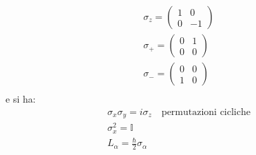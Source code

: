 \begin{itemize}
\begin{equation}
\begin{split}
\sigma_z=\left(\begin{matrix}1&0\\0&-1\end{matrix}\right) \\
\sigma_+=\left(\begin{matrix}0&1\\0&0\end{matrix}\right) \\
\sigma_-=\left(\begin{matrix}0&0\\1&0\end{matrix}\right) \\
\end{split}\end{equation}
e si ha:
\begin{equation}\begin{split}
\sigma_x\sigma_y=i\sigma_z \quad \textrm{permutazioni cicliche} \\
\sigma_x^2=\mathbb{I} \\
L_\alpha=\frac{\hbar }{2}\sigma_\alpha
\end{split}\end{equation}
\end{itemize}

